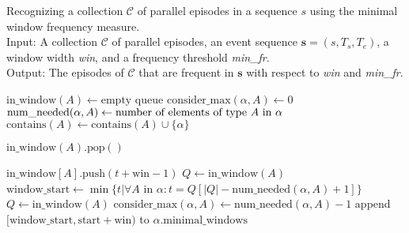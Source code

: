 \begin{algorithm}

\caption{Recognizing a collection $ \mathcal{C} $ of parallel episodes in a sequence $ s $ using the minimal window frequency measure. \\
Input: A collection $ \mathcal{C} $ of parallel episodes, an event sequence $ \boldsymbol{s} = (s, T_s, T_e) $, a window width \textit{win}, and a frequency threshold \textit{min\_fr}. \\
Output: The episodes of $ \mathcal{C} $ that are frequent in $ \boldsymbol{s} $ with respect to \textit{win} and \textit{min\_fr}.}

\begin{algorithmic}[1]

    \State $ \text{in\_window}(A) \gets \text{empty queue} $
\EndFor
{}
        \State $ \text{consider\_max}(\alpha, A) \gets 0 $
        \State $ \text{num\_needed}(\alpha, A) \gets \text{number of elements of type $ A $ in $ \alpha $} $
        \State $ \text{contains}(A) \gets \text{contains}(A) \cup \{ \alpha \} $
    \EndFor
\EndFor

            \State $ \text{in\_window}(A) \text{.pop}() $
        \EndWhile
    \EndFor

        \State $ \text{in\_window}[A] \text{.push}(t + \text{win} - 1) $
                \State $ Q \gets \text{in\_window}(A) $
                \State $ \text{window\_start} \gets \min\{ t | \forall A $ in $ \alpha : t = Q[| Q | - \text{num\_needed}(\alpha, A) + 1] \} $
                    $ Q \gets \text{in\_window}(A) $
                        \State $ \text{consider\_max}(\alpha, A) \gets \text{num\_needed}(\alpha, A) - 1 $
                    \EndIf
                    \State append $ [\text{window\_start}, \text{start} + \text{win}) $ to $ \alpha \text{.minimal\_windows} $
                \EndFor
            \EndIf
        \EndFor
    \EndFor
\EndFor

\end{algorithmic}

\end{algorithm}

